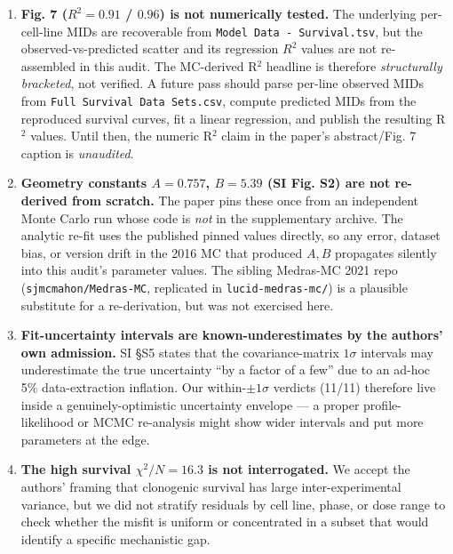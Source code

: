 \documentclass[11pt]{article}
\begin{document}
\begin{enumerate}
  \item \textbf{Fig. 7 ($R^2 = 0.91$ / $0.96$) is not numerically tested.}
        The underlying per-cell-line MIDs are recoverable from
        \texttt{Model Data - Survival.tsv}, but the observed-vs-predicted
        scatter and its regression $R^2$ values are not re-assembled in
        this audit. The MC-derived R$^2$ headline is therefore
        \emph{structurally bracketed}, not verified. A future pass should
        parse per-line observed MIDs from
        \texttt{Full Survival Data Sets.csv}, compute predicted MIDs from
        the reproduced survival curves, fit a linear regression, and
        publish the resulting R$^2$ values. Until then, the numeric
        R$^2$ claim in the paper's abstract/Fig. 7 caption is
        \emph{unaudited}.

  \item \textbf{Geometry constants $A = 0.757$, $B = 5.39$ (SI Fig. S2)
        are not re-derived from scratch.} The paper pins these once from
        an independent Monte Carlo run whose code is \emph{not} in the
        supplementary archive. The analytic re-fit uses the published
        pinned values directly, so any error, dataset bias, or version
        drift in the 2016 MC that produced $A,B$ propagates silently
        into this audit's parameter values. The sibling Medras-MC 2021
        repo (\texttt{sjmcmahon/Medras-MC}, replicated in
        \texttt{lucid-medras-mc/}) is a plausible substitute for a
        re-derivation, but was not exercised here.

  \item \textbf{Fit-uncertainty intervals are known-underestimates by
        the authors' own admission.} SI \S S5 states that the
        covariance-matrix $1\sigma$ intervals may underestimate the true
        uncertainty ``by a factor of a few'' due to an ad-hoc 5\%
        data-extraction inflation. Our within-$\pm 1\sigma$ verdicts
        (11/11) therefore live inside a genuinely-optimistic uncertainty
        envelope --- a proper profile-likelihood or MCMC re-analysis
        might show wider intervals and put more parameters at the edge.

  \item \textbf{The high survival $\chi^2 / N = 16.3$ is not
        interrogated.} We accept the authors' framing that clonogenic
        survival has large inter-experimental variance, but we did not
        stratify residuals by cell line, phase, or dose range to check
        whether the misfit is uniform or concentrated in a subset that
        would identify a specific mechanistic gap.


\end{enumerate}
\end{document}
